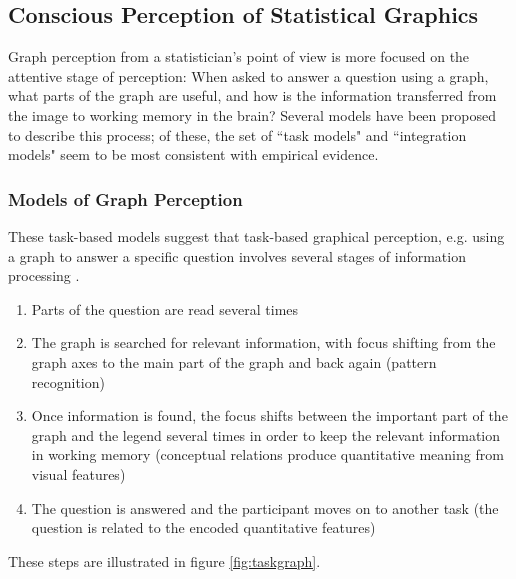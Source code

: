 \documentclass[11pt]{isuthesis}\usepackage[]{graphicx}\usepackage[]{color}
\begin{document}

\subsection{Conscious Perception of Statistical Graphics}\label{HighLevelGraphics}
Graph perception from a statistician's point of view is more focused on the attentive stage of perception: When asked to answer a question using a graph, what parts of the graph are useful, and how is the information transferred from the image to working memory in the brain? Several models have been proposed to describe this process; of these, the set of ``task models" and ``integration models" seem to be most consistent with empirical evidence. 

\subsubsection{Models of Graph Perception}
These task-based models suggest that task-based graphical perception, e.g. using a graph to answer a specific question involves several stages of information processing \citep{ratwani2008thinking}. 
\begin{enumerate}
\item Parts of the question are read several times
\item The graph is searched for relevant information, with focus shifting from the graph axes to the main part of the graph and back again (pattern recognition)
\item Once information is found, the focus shifts between the important part of the graph and the legend several times in order to keep the relevant information in working memory (conceptual relations produce quantitative meaning from visual features)
\item The question is answered and the participant moves on to another task (the question is related to the encoded quantitative features)
\end{enumerate}

These steps are illustrated in figure \ref{fig:taskgraph}. 
\end{document}
